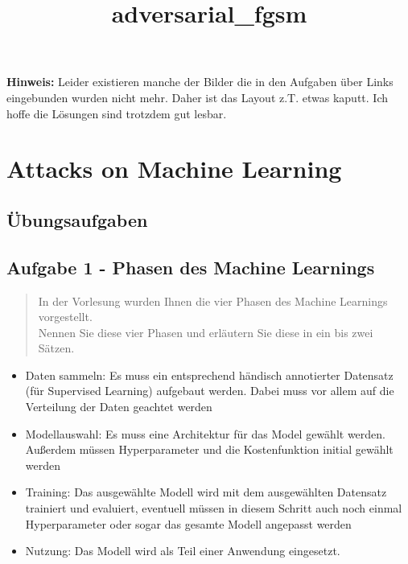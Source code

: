 \documentclass[11pt]{article}
\title{adversarial\_fgsm}
\providecommand{\tightlist}{%
      \setlength{\itemsep}{0pt}\setlength{\parskip}{0pt}}
\begin{document}
    
    \maketitle
    \textbf{Hinweis:} Leider existieren manche der Bilder die in den Aufgaben über Links eingebunden wurden nicht
    mehr. Daher ist das Layout z.T. etwas kaputt. Ich hoffe die Lösungen sind trotzdem gut lesbar.
    
    

    
    \hypertarget{attacks-on-machine-learning}{%
\section{\texorpdfstring{\textbf{Attacks on Machine
Learning}}{Attacks on Machine Learning}}\label{attacks-on-machine-learning}}

\hypertarget{uxfcbungsaufgaben}{%
\subsection{\texorpdfstring{\textbf{Übungsaufgaben}}{Übungsaufgaben}}\label{uxfcbungsaufgaben}}

    \hypertarget{aufgabe-1---phasen-des-machine-learnings}{%
\subsection{Aufgabe 1 - Phasen des Machine
Learnings}\label{aufgabe-1---phasen-des-machine-learnings}}

\begin{quote}
In der Vorlesung wurden Ihnen die vier Phasen des Machine Learnings
vorgestellt.\\
Nennen Sie diese vier Phasen und erläutern Sie diese in ein bis zwei
Sätzen.
\end{quote}

    \begin{itemize}
\tightlist
\item
  Daten sammeln: Es muss ein entsprechend händisch annotierter Datensatz
  (für Supervised Learning) aufgebaut werden. Dabei muss vor allem auf
  die Verteilung der Daten geachtet werden
\item
  Modellauswahl: Es muss eine Architektur für das Model gewählt werden.
  Außerdem müssen Hyperparameter und die Kostenfunktion initial gewählt
  werden
\item
  Training: Das ausgewählte Modell wird mit dem ausgewählten Datensatz
  trainiert und evaluiert, eventuell müssen in diesem Schritt auch noch
  einmal Hyperparameter oder sogar das gesamte Modell angepasst werden
\item
  Nutzung: Das Modell wird als Teil einer Anwendung eingesetzt.
\end{itemize}
\end{document}
